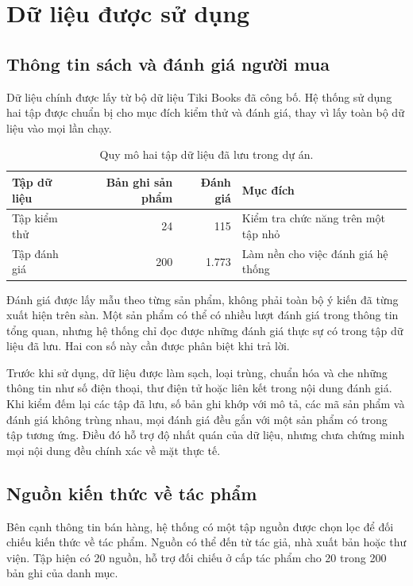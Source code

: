 \section{Dữ liệu được sử dụng}

\subsection{Thông tin sách và đánh giá người mua}
Dữ liệu chính được lấy từ bộ dữ liệu Tiki Books đã công bố. Hệ thống sử dụng hai tập được chuẩn bị cho mục đích kiểm thử và đánh giá, thay vì lấy toàn bộ dữ liệu vào mọi lần chạy. 

\begin{table}[htbp]\small
\caption{Quy mô hai tập dữ liệu đã lưu trong dự án.}
\begin{tabularx}{\linewidth}{YrrY}\toprule
Tập dữ liệu & Bản ghi sản phẩm & Đánh giá & Mục đích\\\midrule
Tập kiểm thử & 24 & 115 & Kiểm tra chức năng trên một tập nhỏ\\
Tập đánh giá & 200 & 1.773 & Làm nền cho việc đánh giá hệ thống\\\bottomrule
\end{tabularx}
\end{table}

Đánh giá được lấy mẫu theo từng sản phẩm, không phải toàn bộ ý kiến đã từng xuất hiện trên sàn. Một sản phẩm có thể có nhiều lượt đánh giá trong thông tin tổng quan, nhưng hệ thống chỉ đọc được những đánh giá thực sự có trong tập dữ liệu đã lưu. Hai con số này cần được phân biệt khi trả lời.

Trước khi sử dụng, dữ liệu được làm sạch, loại trùng, chuẩn hóa và che những thông tin như số điện thoại, thư điện tử hoặc liên kết trong nội dung đánh giá. Khi kiểm đếm lại các tập đã lưu, số bản ghi khớp với mô tả, các mã sản phẩm và đánh giá không trùng nhau, mọi đánh giá đều gắn với một sản phẩm có trong tập tương ứng. Điều đó hỗ trợ độ nhất quán của dữ liệu, nhưng chưa chứng minh mọi nội dung đều chính xác về mặt thực tế.

\subsection{Nguồn kiến thức về tác phẩm}
Bên cạnh thông tin bán hàng, hệ thống có một tập nguồn được chọn lọc để đối chiếu kiến thức về tác phẩm. Nguồn có thể đến từ tác giả, nhà xuất bản hoặc thư viện. Tập hiện có 20 nguồn, hỗ trợ đối chiếu ở cấp tác phẩm cho 20 trong 200 bản ghi của danh mục. 

